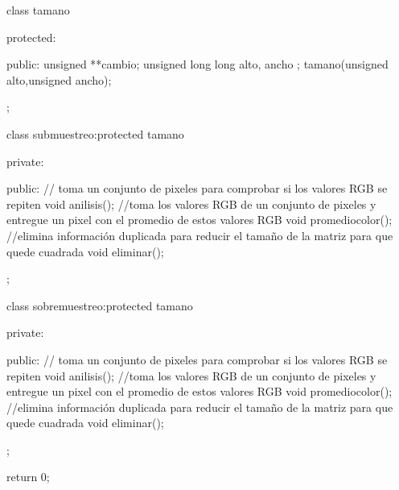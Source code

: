 \documentclass{article}
\begin{document}
    class tamano
    {
    protected:

    public:
        unsigned **cambio;
        unsigned long long alto, ancho ;
        tamano(unsigned alto,unsigned ancho);

    };

    class submuestreo:protected tamano
    {
    private:

    public:
        // toma un conjunto de pixeles para comprobar si los valores RGB se repiten
        void anilisis();
        //toma los valores RGB de un conjunto de pixeles y entregue un pixel con el promedio de estos valores RGB
        void promediocolor();
        //elimina información duplicada para reducir el tamaño de la matriz para que quede cuadrada
        void eliminar();

    };
    
    
    class sobremuestreo:protected tamano
    {
    private:
                
    public:
        // toma un conjunto de pixeles para comprobar si los valores RGB se repiten
        void anilisis();
        //toma los valores RGB de un conjunto de pixeles y entregue un pixel con el promedio de estos valores RGB
        void promediocolor();
        //elimina información duplicada para reducir el tamaño de la matriz para que quede cuadrada
        void eliminar();

    };


    return 0;


\begin{lstlisting}[language=C++, label=codigo clases]


















\end{lstlisting}


\end{document}
